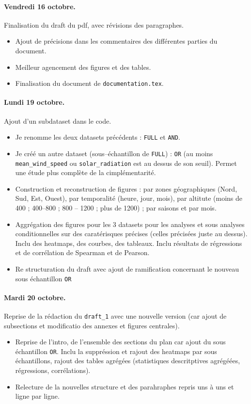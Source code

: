 \documentclass[11pt, a4paper]{article}
\begin{document}
\paragraph{Vendredi 16 octobre.} Finalisation du draft du pdf, avec révisions des paragraphes.
\begin{itemize}
    \item Ajout de précisions dans les commentaires des différentes parties du document.
    \item Meilleur agencement des figures et des tables.
    \item Finalisation du document de \texttt{documentation.tex}.
\end{itemize}

\paragraph{Lundi 19 octobre.} Ajout d'un subdataset dans le code. 
\begin{itemize}
    \item Je renomme les deux datasets précédents : \texttt{FULL} et \texttt{AND}.
    \item Je créé un autre dataset (sous--échantillon de \texttt{FULL}) : \texttt{OR} (au moins \texttt{mean\_wind\_speed} ou \texttt{solar\_radiation} est au dessus de son seuil). Permet une étude plus complète de la cimplémentarité.
    \item Construction et reconstruction de figures : par zones géographiques (Nord, Sud, Est, Ouest), par temporalité (heure, jour, mois), par altitute (moins de 400 ; 400--800 ; 800 -- 1200 ; plus de 1200) ; par saisons et par mois. 
    \item Aggrégation des figures pour les 3 datasets pour les analyses et sous analyses conditionnelles sur des caratérisques précises (celles précisées juste au dessus). Inclu des heatmaps, des courbes, des tableaux. Inclu résultats de régressions et de corrélation de Spearman et de Pearson.
    \item Re structuration du draft avec ajout de ramification concernant le nouveau sous échantillon \texttt{OR}
\end{itemize}

\paragraph{Mardi 20 octobre.} Reprise de la rédaction du \texttt{draft\_1} avec une nouvelle version (car ajout de subsections et modificatio des annexes et figures centrales).
\begin{itemize}
    \item Reprise de l'intro, de l'ensemble des sections du plan car ajout du sous échantillon \texttt{OR}. Inclu la suppréssion et rajout des heatmaps par sous échantillons, rajout des tables agrégées (statistiques descritptives agrégéées, régressions, corrélations).
    \item Relecture de la nouvelles structure et des parahraphes repris uns à uns et ligne par ligne. 
\end{itemize}
\end{document}
